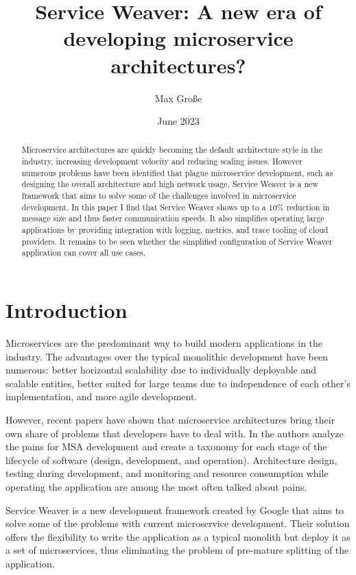 \documentclass[sigconf,review,9pt]{acmart}
\title{Service Weaver: A new era of developing microservice architectures?}
\author{Max Große}
\date{June 2023}
\begin{document}
\begin{abstract}
	Microservice architectures are quickly becoming the default architecture style
	in the industry, increasing development velocity and reducing scaling issues.
	However numerous problems have been identified that plague microservice development,
	such as designing the overall architecture and high network usage.
	Service Weaver is a new framework that aims to solve some of the challenges involved
	in microservice development.
	In this paper I find that Service Weaver shows up to a 10\% reduction in message size
	and thus faster communication speeds.
	It also simplifies operating large applications by providing integration with
	logging, metrics, and trace tooling of cloud providers.
	It remains to be seen whether the simplified configuration of Service Weaver application
	can cover all use cases.
\end{abstract}

\maketitle

\section{Introduction}
Microservices are the predominant way to build modern applications in the industry. \cite{wang_ms_current_situation}
The advantages over the typical monolithic development have been numerous:
better horizontal scalability due to individually deployable and scalable entities,
better suited for large teams due to independence of each other's implementation,
and more agile development.

However, recent papers have shown that microservice architectures bring their own share
of problems that developers have to deal with.
In \cite{soldani_pains_gains} the authors analyze the pains for MSA development
and create a taxonomy for each stage of the lifecycle of software (design, development, and operation).
Architecture design, testing during development, and monitoring and resource consumption
while operating the application are among the most often talked about pains.

Service Weaver is a new development framework created by Google that aims to solve some of
the problems with current microservice development.
Their solution offers the flexibility to write the application as a typical monolith
but deploy it as a set of microservices, thus eliminating the problem of pre-mature
splitting of the application.
\end{document}
